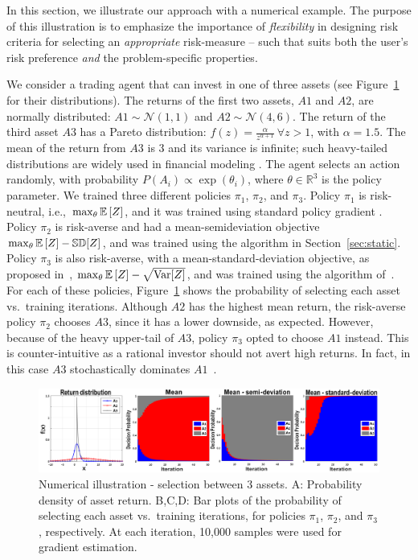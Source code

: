 \documentclass{article} %
\begin{document}
In this section, we illustrate our approach with a numerical example. The purpose of this illustration is to emphasize the importance of \emph{flexibility} in designing risk criteria for selecting an \emph{appropriate} risk-measure -- such that suits both the user's risk preference \emph{and} the problem-specific properties.

We consider a trading agent that can invest in one of three assets (see Figure~\ref{fig:1} for their distributions). The returns of the first two assets, $A1$ and $A2$, are normally distributed: $A1\sim \mathcal N (1,1)$ and $A2\sim \mathcal N (4,6)$. The return of the third asset $A3$ has a Pareto distribution: $f(z) = \frac{\alpha}{z^{\alpha+1}}~\forall z>1$, with $\alpha = 1.5$. The mean of the return from $A3$ is 3 and its variance is infinite; such heavy-tailed distributions are widely used in financial modeling \cite{rachev2000stable}. The agent selects an action randomly, with probability $P(A_i)\propto \exp (\theta_i)$, where $\theta\in \mathbb R^3$ is the policy parameter. We trained three different policies $\pi_1$, $\pi_2$, and $\pi_3$. Policy $\pi_1$ is risk-neutral, i.e.,~$\max_\theta \mathbb{E}\left[ Z \right]$, and it was trained using standard policy gradient \cite{MarTsi98}. Policy $\pi_2$ is risk-averse and had a mean-semideviation objective $\max_\theta \mathbb{E}\left[ Z \right] - \mathbb{SD}[Z]$, and was trained using the algorithm in Section~\ref{sec:static}. Policy $\pi_3$ is also risk-averse, with a mean-standard-deviation objective, as proposed in~\cite{tamar2012policy,prashanth2013actor}, $\max_\theta \mathbb{E}\left[ Z \right] - \sqrt{\textrm{Var}[Z]}$, and was trained using the algorithm of~\cite{tamar2012policy}. For each of these policies, Figure~\ref{fig:1} shows the probability of selecting each asset vs.~training iterations. Although $A2$ has the highest mean return, the risk-averse policy $\pi_2$ chooses $A3$, since it has a lower downside, as expected. However, because of the heavy upper-tail of $A3$, policy $\pi_3$ opted to choose $A1$ instead. This is counter-intuitive as a rational investor should not avert high returns. In fact, in this case $A3$ stochastically dominates $A1$~\cite{hadar1969rules}.

\begin{figure}
\centering
\includegraphics[width=\textwidth]{NIPS_FIG1new}
  \caption{Numerical illustration - selection between 3 assets. A: Probability density of asset return. B,C,D: Bar plots of the probability of selecting each asset vs.~training iterations, for policies $\pi_1$, $\pi_2$, and $\pi_3$, respectively. At each iteration, 10,000 samples were used for gradient estimation.}\label{fig:1}
  \vspace{-0.1in}
\end{figure}
\end{document}
